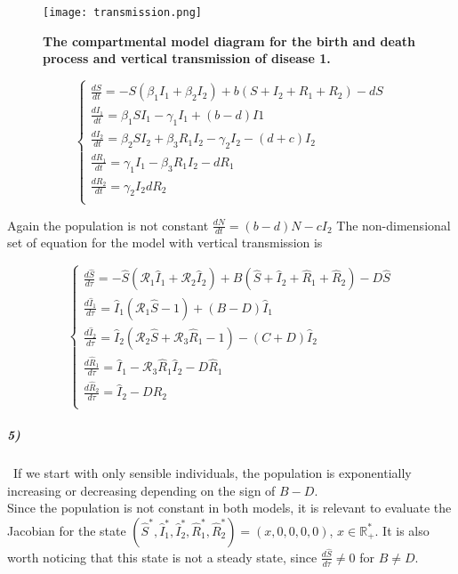 \documentclass{article}
\begin{document}
\begin{figure}[H]
	  \centering
  	\texttt{[image: transmission.png]}
  	\caption{\textbf{The compartmental model diagram for the birth and death process and vertical transmission of disease 1.}}
	\end{figure}
	
$$ \displaystyle \left \{
    \begin{array}{ll}
        \frac{dS}{dt}=-S(\beta_1 I_1+\beta_2 I_2)+b(S+I_2+R_1+R_2)-dS\\
		\frac{dI_1}{dt}= \beta_1 S I_1 - \gamma_1 I_1 +(b-d) I1 \\
		\frac{dI_2}{dt}= \beta_2 S I_2+\beta_3 R_1 I_2 - \gamma_2 I_2 -(d+c) I_2 \\
		\frac{dR_1}{dt}= \gamma_1 I_1-\beta_3 R_1 I_2 - d R_1 \\
		\frac{dR_2}{dt}= \gamma_2 I_2 d R_2 \\
    \end{array}
\right. $$

Again the population is not constant $\frac{dN}{dt}=(b-d)N-c I_2$
The non-dimensional set of equation for the model with vertical transmission is  

$$ \displaystyle \left \{
    \begin{array}{ll}
        \frac{d\widehat{S}}{d\tau}=-\widehat{S}(\pmb{\mathcal{R}}_1 \widehat{I}_1+ \pmb{\mathcal{R}}_2 \widehat{I}_2)+B(\widehat{S}+\widehat{I}_2+\widehat{R}_1+\widehat{R}_2)-D \widehat{S}\\
		\frac{d\widehat{I}_1}{d\tau}= \widehat{I}_1(\pmb{\mathcal{R}}_1 \widehat{S}-1) +(B-D) \widehat{I}_1\\
		\frac{d\widehat{I}_2}{d\tau}= \widehat{I}_2(\pmb{\mathcal{R}}_2 \widehat{S} + \pmb{\mathcal{R}}_3 \widehat{R}_1 - 1)-(C+D) \widehat{I}_2 \\
		\frac{d\widehat{R}_1}{d\tau}= \widehat{I}_1-\pmb{\mathcal{R}}_3 \widehat{R}_1 \widehat{I}_2 -D \widehat{R}_1\\
		\frac{d\widehat{R}_2}{d\tau}= \widehat{I}_2 -D \widehat{R}_2\\
    \end{array}
\right. $$
\subparagraph{5)}
\
If we start with only sensible individuals, the population is exponentially increasing or decreasing depending on the sign of $B-D$.  \\

Since the population is not constant in both models, it is relevant to evaluate the Jacobian for the state $(\widehat{S}^*,\widehat{I}_1^*,\widehat{I}_2^*,\widehat{R}_1^*,\widehat{R}_2^*)=(x,0,0,0,0)$, $x \in \mathbb{R_+^*}$. It is also worth noticing that this state is not a steady state, since  $\frac{d\widehat{S}}{d\tau} \neq 0$ for $B \neq D$. \\
\end{document}
